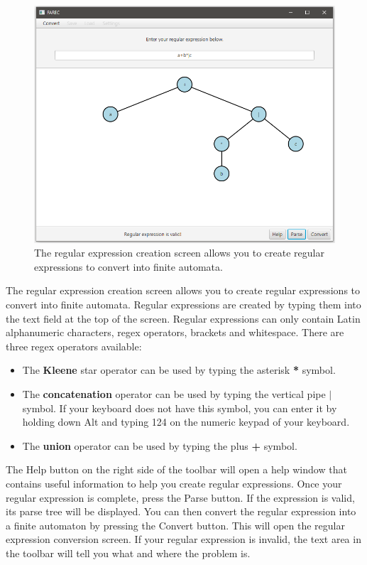 \documentclass[12pt]{report}
\begin{document}
\begin{figure}[htb]
    \centering
    \includegraphics[width=\textwidth]{./Diagrams/CreateREScreen.png}
    \caption{The regular expression creation screen allows you to create regular
    expressions to convert into finite automata.}
    \label{CreateREScreen}
\end{figure}

The regular expression creation screen allows you to create regular expressions
to convert into finite automata. Regular expressions are created by typing them
into the text field at the top of the screen. Regular expressions can only
contain Latin alphanumeric characters, regex operators, brackets and whitespace.
There are three regex operators available:

\begin{itemize}
    \item The \textbf{Kleene} star operator can be used by typing the asterisk
    \textbf{*} symbol.
    \item The \textbf{concatenation} operator can be used by typing the vertical
    pipe \textbf{$|$} symbol. If your keyboard does not have this symbol, you
    can enter it by holding down Alt and typing 124 on the numeric keypad of
    your keyboard.
    \item The \textbf{union} operator can be used by typing the plus \textbf{+}
    symbol.
\end{itemize}

The Help button on the right side of the toolbar will open a help window that
contains useful information to help you create regular expressions. Once your
regular expression is complete, press the Parse button. If the expression is
valid, its parse tree will be displayed. You can then convert the regular
expression into a finite automaton by pressing the Convert button. This will
open the regular expression conversion screen. If your regular expression is
invalid, the text area in the toolbar will tell you what and where the problem
is.
\end{document}
